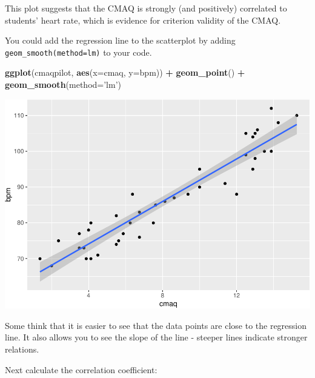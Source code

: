 \documentclass[
]{book}
\newenvironment{Shaded}{\begin{snugshade}}{\end{snugshade}}
\newcommand{\DataTypeTok}[1]{\textcolor[rgb]{0.13,0.29,0.53}{#1}}
\newcommand{\KeywordTok}[1]{\textcolor[rgb]{0.13,0.29,0.53}{\textbf{#1}}}
\newcommand{\NormalTok}[1]{#1}
\newcommand{\OperatorTok}[1]{\textcolor[rgb]{0.81,0.36,0.00}{\textbf{#1}}}
\newcommand{\OtherTok}[1]{\textcolor[rgb]{0.56,0.35,0.01}{#1}}
\newcommand{\StringTok}[1]{\textcolor[rgb]{0.31,0.60,0.02}{#1}}
\begin{document}
This plot suggests that the CMAQ is strongly (and positively) correlated to students' heart rate, which is evidence for criterion validity of the CMAQ.

You could add the regression line to the scatterplot by adding \texttt{geom\_smooth(method=\textquotesingle{}lm\textquotesingle{})} to your code.

\begin{Shaded}
\begin{Highlighting}[]
\KeywordTok{ggplot}\NormalTok{(cmaqpilot, }\KeywordTok{aes}\NormalTok{(}\DataTypeTok{x=}\NormalTok{cmaq, }\DataTypeTok{y=}\NormalTok{bpm)) }\OperatorTok{+}
\StringTok{  }\KeywordTok{geom_point}\NormalTok{() }\OperatorTok{+}
\StringTok{  }\KeywordTok{geom_smooth}\NormalTok{(}\DataTypeTok{method=}\StringTok{'lm'}\NormalTok{)}
\end{Highlighting}
\end{Shaded}

\includegraphics{Tools-for-working-with-data-211_files/figure-latex/unnamed-chunk-24-1.pdf}

Some think that it is easier to see that the data points are close to the regression line. It also allows you to see the slope of the line - steeper lines indicate stronger relations.

Next calculate the correlation coefficient:

\begin{Shaded}
\end{Shaded}
\end{document}
